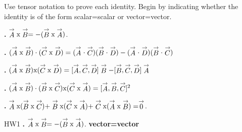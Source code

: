 {\flushleft Use tensor notation to prove each identity. Begin by indicating whether the identity is of the form scalar=scalar or vector=vector.




{\bf {}.}   $ \stackrel{\rightarrow}{A} \textup{x} \stackrel{\rightarrow}{B} = - (\stackrel{\rightarrow}{B} \textup{x} \stackrel{\rightarrow}{A})$.

\vspace{.5in}

{\bf {}.} $(\stackrel{\rightarrow}{A} \textup{x} \stackrel{\rightarrow}{B})\cdot (\stackrel{\rightarrow}{C} \textup{x} \stackrel{\rightarrow}{D})=(\stackrel{\rightarrow}{A} \cdot \stackrel{\rightarrow}{C})(\stackrel{\rightarrow}{B} \cdot \stackrel{\rightarrow}{D} ) -
(\stackrel{\rightarrow}{A} \cdot \stackrel{\rightarrow}{D})(\stackrel{\rightarrow}{B} \cdot \stackrel{\rightarrow}{C} )$



\vspace{1.5in}
{\bf {}.} $(\stackrel{\rightarrow}{A} \textup{x} \stackrel{\rightarrow}{B})\textup{x} (\stackrel{\rightarrow}{C} \textup{x} \stackrel{\rightarrow}{D})= [\stackrel{\rightarrow}{A} , \stackrel{\rightarrow}{C} , \stackrel{\rightarrow}{D}] \stackrel{\rightarrow}{B} -
[\stackrel{\rightarrow}{B} , \stackrel{\rightarrow}{C} , \stackrel{\rightarrow}{D}] \stackrel{\rightarrow}{A}$


\vspace{1.5in}

{\bf {}.} $(\stackrel{\rightarrow}{A} \textup{x} \stackrel{\rightarrow}{B})\cdot (\stackrel{\rightarrow}{B} \textup{x} \stackrel{\rightarrow}{C}) \textup{x} (\stackrel{\rightarrow}{C} \textup{x} \stackrel{\rightarrow}{A})= [\stackrel{\rightarrow}{A} , \stackrel{\rightarrow}{B} , \stackrel{\rightarrow}{C}]^2$

\vspace{2in}

{\bf {}.}   $ \stackrel{\rightarrow}{A} \textup{x} (\stackrel{\rightarrow}{B}\textup{x} \stackrel{\rightarrow}{C}) +   \stackrel{\rightarrow}{B} \textup{x} (\stackrel{\rightarrow}{C}\textup{x} \stackrel{\rightarrow}{A}) +   \stackrel{\rightarrow}{C} \textup{x} (\stackrel{\rightarrow}{A}\textup{x} \stackrel{\rightarrow}{B})= \stackrel{\rightarrow}{0}$.



\newpage

{\flushleft HW1}
{\bf {}.}   $ \stackrel{\rightarrow}{A} \textup{x} \stackrel{\rightarrow}{B} = - (\stackrel{\rightarrow}{B} \textup{x} \stackrel{\rightarrow}{A})$.
{\flushleft \bf vector=vector}

}
